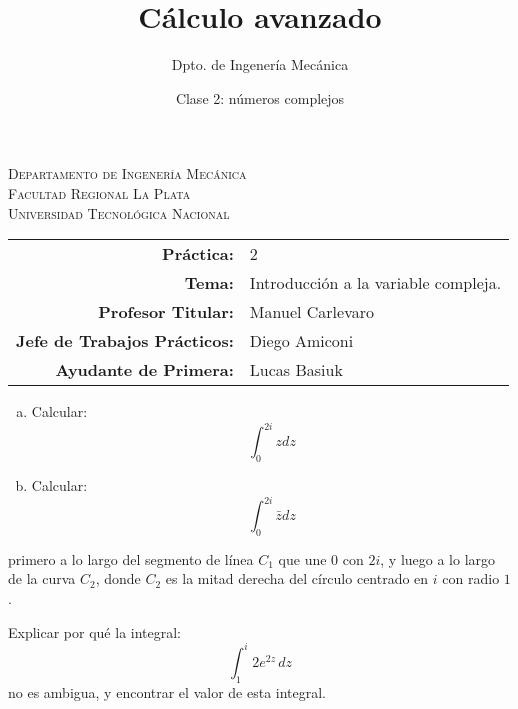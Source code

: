 \documentclass[11pt]{article}
\title{Cálculo avanzado}
\author{Dpto. de Ingenería Mecánica}
\date{Clase 2: números complejos}
\begin{document}
\begin{center}
\end{center} 

\begin{center}
\vspace{\baselineskip}
\Large{\textsc{Departamento de Ingenería Mecánica}} \\
\textsc{Facultad Regional La Plata} \\
\textsc{Universidad Tecnológica Nacional}
\end{center}


\begin{center}
\begin{tabular}{r l}
    \textbf{Práctica:} & 2 \\
 \textbf{Tema:} & Introducción a la variable compleja. \\
 \textbf{Profesor Titular:} & Manuel Carlevaro \\
 \textbf{Jefe de Trabajos Prácticos:} & Diego Amiconi \\
 \textbf{Ayudante de Primera:} & Lucas Basiuk 
\end{tabular}\end{center}

\vspace{1em}

\begin{question} %
    \begin{enumerate}[a)]
        \item Calcular:
        \[ \int_0^{2i} z dz \]
    \item Calcular:
        \[ \int_0^{2 i} \bar{z} dz \]
\end{enumerate}
primero a lo largo del segmento de línea $C_1$ que une $0$ con $2i$, y luego a lo largo de la curva $C_2$, donde $C_2$ es la mitad derecha del círculo centrado en $i$ con radio $1$.
\end{question}

\begin{question} %
Explicar por qué la integral:
\[ \int_1^i 2 e^{2z} \, dz \]
no es ambigua, y encontrar el valor de esta integral.
\end{question}
\end{document}
